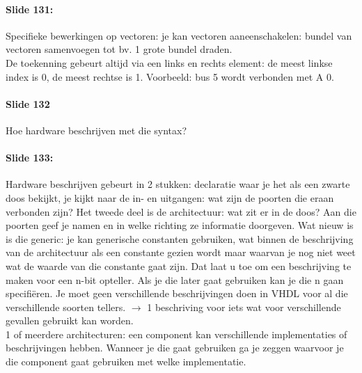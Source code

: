 \documentclass[10pt,a4paper]{book}
\begin{document}
\paragraph{Slide 131:} Specifieke bewerkingen op vectoren: je kan vectoren aaneenschakelen: bundel van vectoren samenvoegen tot bv. 1 grote bundel draden.\\
De toekenning gebeurt altijd via een links en rechts element: de meest linkse index is 0, de meest rechtse is 1. Voorbeeld: bus 5 wordt verbonden met A 0.

\paragraph{Slide 132} Hoe hardware beschrijven met die syntax? 

\paragraph{Slide 133:} Hardware beschrijven gebeurt in 2 stukken: declaratie waar je het als een zwarte doos bekijkt, je kijkt naar de in- en uitgangen: wat zijn de poorten die eraan verbonden zijn? Het tweede deel is de architectuur: wat zit er in de doos? Aan die poorten geef je namen en in welke richting ze informatie doorgeven. Wat nieuw is is die generic: je kan generische constanten gebruiken, wat binnen de beschrijving van de architectuur als een constante gezien wordt maar waarvan je nog niet weet wat de waarde van die constante gaat zijn. Dat laat u toe om een beschrijving te maken voor een n-bit opteller. Als je die later gaat gebruiken kan je die n gaan specifi\"eren. Je moet geen verschillende beschrijvingen doen in VHDL voor al die verschillende soorten tellers. $\rightarrow$ 1 beschriving voor iets wat voor verschillende gevallen gebruikt kan worden.\\
1 of meerdere architecturen: een component kan verschillende implementaties of beschrijvingen hebben. Wanneer je die gaat gebruiken ga je zeggen waarvoor je die component gaat gebruiken met welke implementatie.
\end{document}
